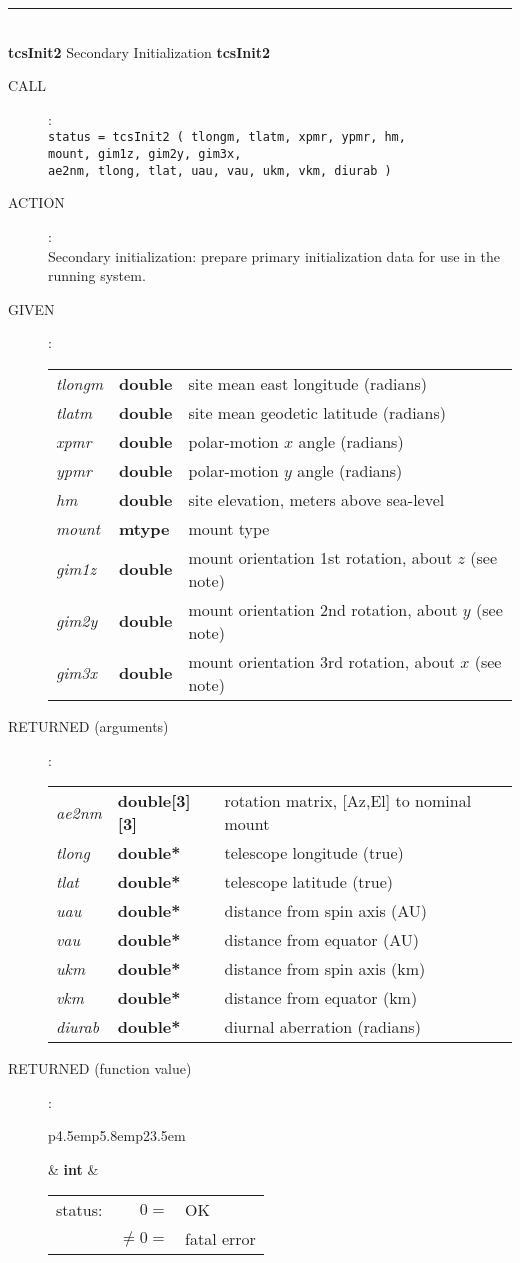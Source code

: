 \documentclass[12pt,fleqn,twoside]{article}
\renewcommand{\_}{{\tt\char'137}}     %
\newcommand{\routine}[2]
{
  \newpage
  \rule{\textwidth}{0.3mm}\\ \nopagebreak
  {\Large {\bf #1} \hfill #2 \hfill {\bf #1}}
  \vspace{-1ex}
}
\newcommand{\call}[1]
{
  \goodbreak
  \begin{description}
    \item[CALL]: \\[0.5ex] \nopagebreak
        {\tt #1}
  \end{description}
  \vspace{-3ex}
}
\newcommand{\action}[1]
{
  \goodbreak
  \begin{description}
    \item[ACTION]: \\[0.5ex] \nopagebreak
        #1
  \end{description}
  \vspace{-3ex}
}
\newcommand{\args}[2]
{
  \goodbreak
  \begin{description}
  \item[#1]: \\[1.5ex] \nopagebreak
    \hspace*{-0.9em}
    \begin{tabular}{p{4.5em}p{5.8em}p{23.5em}}
      #2
    \end{tabular}
  \end{description}
  \vspace{-3ex}
}
\newcommand{\spec}[3]
{
  {\em {#1}} & {\bf \mbox{#2}} & {#3}
}
\begin{document}
\routine{tcsInit2}{Secondary Initialization}
\label{tcsInit2}
\call{status = tcsInit2 ( tlongm, tlatm, xpmr, ypmr, hm, \\
           \hspace*{9.6em}  mount, gim1z, gim2y, gim3x, \\
           \hspace*{9.6em}  ae2nm, tlong, tlat, uau, vau, ukm, vkm, diurab ) }
\action{Secondary initialization: prepare primary initialization
        data for use in the running system.}
\args{GIVEN}
{
\spec{tlongm}{double}{site mean east longitude (radians)} \\
\spec{tlatm}{double}{site mean geodetic latitude (radians)} \\
\spec{xpmr}{double}{polar-motion $x$ angle (radians)} \\
\spec{ypmr}{double}{polar-motion $y$ angle (radians)} \\
\spec{hm}{double}{site elevation, meters above sea-level} \\
\spec{mount}{\sc mtype}{mount type} \\
\spec{gim1z}{double}{mount orientation 1st rotation, about $z$ (see note)} \\
\spec{gim2y}{double}{mount orientation 2nd rotation, about $y$ (see note)} \\
\spec{gim3x}{double}{mount orientation 3rd rotation, about $x$ (see note)}
}
\args{RETURNED \rm (arguments)}
{
\spec{ae2nm}{double[3][3]}{rotation matrix, [Az,El] to nominal mount} \\
\spec{tlong}{double*}{telescope longitude (true)} \\
\spec{tlat}{double*}{telescope latitude (true)} \\
\spec{uau}{double*}{distance from spin axis (AU)} \\
\spec{vau}{double*}{distance from equator (AU)} \\
\spec{ukm}{double*}{distance from spin axis (km)} \\
\spec{vkm}{double*}{distance from equator (km)} \\
\spec{diurab}{double*}{diurnal aberration (radians)}
}
\args{RETURNED \rm (function value)}
{
\spec{}{int}{\hspace{-1.8ex}
             \begin{tabular}[t]{lrl}
                status: & $      0 = $ & OK \\
                        & $ \neq 0 = $ & fatal error \\
             \end{tabular}
            }
}
\end{document}
